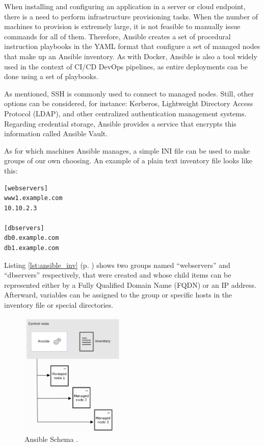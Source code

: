 When installing and configuring an application in a server or cloud endpoint, there is a need to perform infrastructure provisioning tasks. When the number of machines to provision is extremely large, it is not feasible to manually issue commands for all of them. Therefore, Ansible creates a set of procedural instruction playbooks in the YAML format that configure a set of managed nodes that make up an Ansible inventory. As with Docker, Ansible is also a tool widely used in the context of CI/CD DevOps pipelines, as entire deployments can be done using a set of playbooks.

As mentioned, SSH is commonly used to connect to managed nodes. Still, other options can be considered, for instance: Kerberos, Lightweight Directory Access Protocol (LDAP), and other centralized authentication management systems. Regarding credential storage, Ansible provides a service that encrypts this information called Ansible Vault.

As for which machines Ansible manages, a simple INI file can be used to make groups of our own choosing. An example of a plain text inventory file looks like this:

\begin{lstlisting}[caption=Ansible Example Inventory file.,numbers=none,label={lst:ansible_inv}]
[webservers]
www1.example.com
10.10.2.3

[dbservers]
db0.example.com
db1.example.com
\end{lstlisting}

Listing \ref{lst:ansible_inv} (p. \pageref{lst:ansible_inv}) shows two groups named ``webservers'' and ``dbservers'' respectively, that were created and whose child items can be represented either by a Fully Qualified Domain Name (FQDN) or an IP address. Afterward, variables can be assigned to the group or specific hosts in the inventory file or special directories.

\begin{figure}[H]
    \includegraphics[width=5cm]{figures/ansible_scheme.png}
    \caption{Ansible Schema \cite{ansible_schema_ref}.}
    \label{fig:ansible_schema}
\end{figure}

